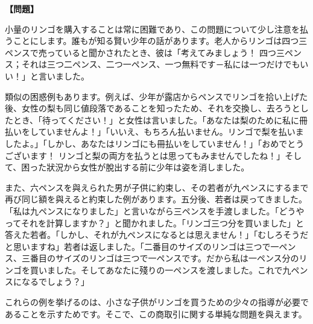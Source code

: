 \documentclass[10pt,a4paper,oneside,openany]{ltjsbook}
\begin{document}
\begin{tcolorbox}[colback=softblue,colframe=primaryblue,title=\textbf{第 36 問：BUYING APPLES.},arc=2mm,boxrule=1pt,breakable]
\textbf{【問題】}\par\vspace{0.3em}

小量のリンゴを購入することは常に困難であり、この問題について少し注意を払うことにします。誰もが知る賢い少年の話があります。老人からリンゴは四つ三ペンスで売っていると聞かされたとき、彼は「考えてみましょう！ 四つ三ペンス；それは三つ二ペンス、二つ一ペンス、一つ無料です－私には一つだけでもいい！」と言いました。

類似の困惑例もあります。例えば、少年が露店からペンスでリンゴを拾い上げた後、女性の梨も同じ値段落であることを知ったため、それを交換し、去ろうとしたとき、「待ってください！」と女性は言いました。「あなたは梨のために私に冊払いをしていませんよ！」「いいえ、もちろん払いません。リンゴで梨を払いましたよ。」「しかし、あなたはリンゴにも冊払いをしていません！」「おめでとうございます！ リンゴと梨の両方を払うとは思ってもみませんでしたね！」そして、困った狀況から女性が脫出する前に少年は姿を消しました。

また、六ペンスを與えられた男が子供に約束し、その若者が九ペンスにするまで再び同じ額を與えると約束した例があります。五分後、若者は戻ってきました。「私は九ペンスになりました」と言いながら三ペンスを手渡しました。「どうやってそれを計算しますか？」と聞かれました。「リンゴ三つ分を買いました」と答えた若者。「しかし、それが九ペンスになるとは思えません！」「むしろそうだと思いますね」若者は返しました。「二番目のサイズのリンゴは三つで一ペンス、三番目のサイズのリンゴは三つで一ペンスです。だから私は一ペンス分のリンゴを買いました。そしてあなたに殘りの一ペンスを渡しました。これで九ペンスになるでしょう？」

これらの例を挙げるのは、小さな子供がリンゴを買うための少々の指導が必要であることを示すためです。そこで、この商取引に関する単純な問題を與えます。


\end{tcolorbox}
\end{document}
